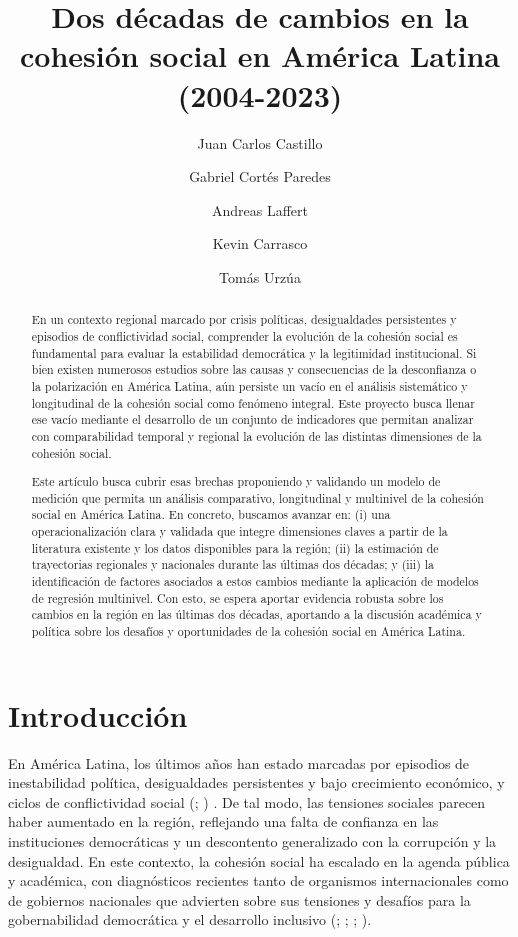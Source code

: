 \documentclass[
  letterpaper,
  DIV=11,
  numbers=noendperiod]{scrartcl}
\title{Dos décadas de cambios en la cohesión social en América Latina
(2004-2023)}
\author{Juan Carlos Castillo \and Gabriel Cortés Paredes \and Andreas
Laffert \and Kevin Carrasco \and Tomás Urzúa}
\date{}
\begin{document}
\maketitle
\begin{abstract}
En un contexto regional marcado por crisis políticas, desigualdades
persistentes y episodios de conflictividad social, comprender la
evolución de la cohesión social es fundamental para evaluar la
estabilidad democrática y la legitimidad institucional. Si bien existen
numerosos estudios sobre las causas y consecuencias de la desconfianza o
la polarización en América Latina, aún persiste un vacío en el análisis
sistemático y longitudinal de la cohesión social como fenómeno integral.
Este proyecto busca llenar ese vacío mediante el desarrollo de un
conjunto de indicadores que permitan analizar con comparabilidad
temporal y regional la evolución de las distintas dimensiones de la
cohesión social.

Este artículo busca cubrir esas brechas proponiendo y validando un
modelo de medición que permita un análisis comparativo, longitudinal y
multinivel de la cohesión social en América Latina. En concreto,
buscamos avanzar en: (i) una operacionalización clara y validada que
integre dimensiones claves a partir de la literatura existente y los
datos disponibles para la región; (ii) la estimación de trayectorias
regionales y nacionales durante las últimas dos décadas; y (iii) la
identificación de factores asociados a estos cambios mediante la
aplicación de modelos de regresión multinivel. Con esto, se espera
aportar evidencia robusta sobre los cambios en la región en las últimas
dos décadas, aportando a la discusión académica y política sobre los
desafíos y oportunidades de la cohesión social en América Latina.
\end{abstract}


\section{Introducción}\label{introducciuxf3n}

En América Latina, los últimos años han estado marcadas por episodios de
inestabilidad política, desigualdades persistentes y bajo crecimiento
económico, y ciclos de conflictividad social
(; ) . De tal modo, las tensiones sociales parecen haber aumentado en
la región, reflejando una falta de confianza en las instituciones
democráticas y un descontento generalizado con la corrupción y la
desigualdad. En este contexto, la cohesión social ha escalado en la
agenda pública y académica, con diagnósticos recientes tanto de
organismos internacionales como de gobiernos nacionales que advierten
sobre sus tensiones y desafíos para la gobernabilidad democrática y el
desarrollo inclusivo (;
;
; ).
\end{document}
